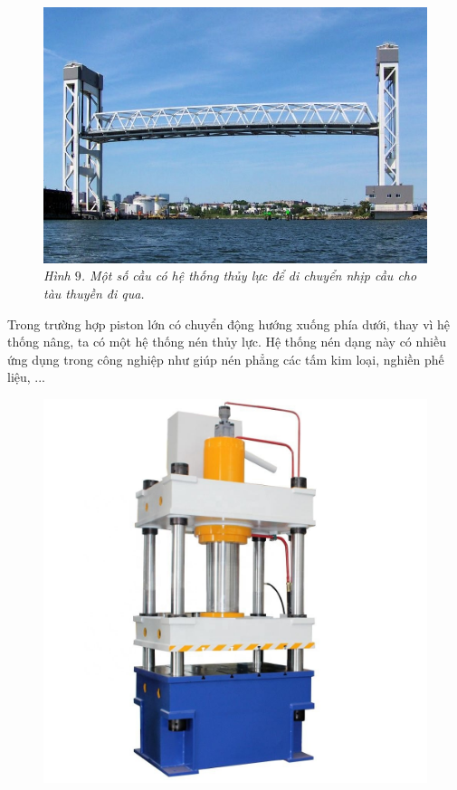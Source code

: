 \begin{multicols}{2}
\begin{figure}[H]
		\vspace*{-10pt}
	\end{figure}
	\begin{figure}[H]
		\vspace*{5pt}
		\centering
		\captionsetup{labelformat= empty, justification=centering}
		\includegraphics[width= 1\linewidth]{20}
		\caption{\small\textit{\color{timhieukhoahoc}Hình $9$. Một số cầu có hệ thống thủy lực để di chuyển nhịp cầu cho tàu thuyền đi qua.}}
		\vspace*{-10pt}
	\end{figure}
	Trong trường hợp piston lớn có chuyển động hướng xuống phía dưới, thay vì hệ thống nâng, ta có một hệ thống nén thủy lực. Hệ thống nén dạng này có nhiều ứng dụng trong công nghiệp như giúp nén phẳng các tấm kim loại, nghiền phế liệu, ...
	\begin{figure}[H]
		\vspace*{-5pt}
		\centering
		\captionsetup{labelformat= empty, justification=centering}
		\includegraphics[width= 0.85\linewidth]{21}

\end{figure}
\end{multicols}

